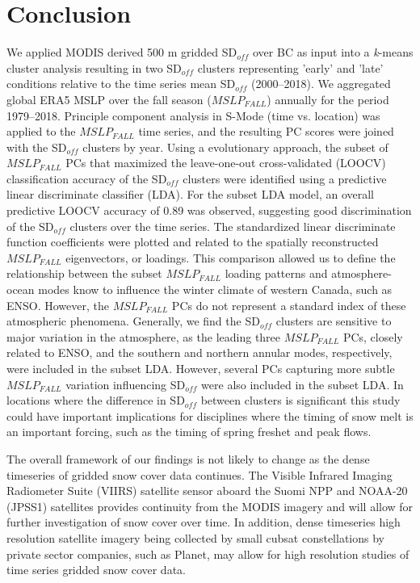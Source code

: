 \documentclass{tATO2e}
\newcommand{\sdoff}{SD$_{off}$}
\begin{document}
\section{Conclusion}
 We applied MODIS derived 500 m gridded \sdoff{} over BC as input into a \textit{k}-means cluster analysis resulting in two \sdoff{} clusters representing 'early' and 'late' conditions relative to the time series mean \sdoff{} (2000--2018). We aggregated global ERA5 MSLP over the fall season ($MSLP_{FALL}$) annually for the period 1979--2018. Principle component analysis in S-Mode (time vs. location) was applied to the $MSLP_{FALL}$ time series, and the resulting PC scores were joined with the \sdoff{} clusters by year. Using a evolutionary approach, the subset of $MSLP_{FALL}$ PCs that maximized the leave-one-out cross-validated (LOOCV) classification accuracy of the \sdoff{} clusters were identified using a predictive linear discriminate classifier (LDA). For the subset LDA model, an overall predictive LOOCV accuracy of 0.89 was observed, suggesting good discrimination of the \sdoff{} clusters over the time series. The standardized linear discriminate function coefficients were plotted and related to the spatially reconstructed $MSLP_{FALL}$ eigenvectors, or loadings. This comparison allowed us to define the relationship between the subset $MSLP_{FALL}$ loading patterns and atmosphere-ocean modes know to influence the winter climate of western Canada, such as ENSO. However, the $MSLP_{FALL}$ PCs do not represent a standard index of these atmospheric phenomena. Generally, we find the \sdoff{} clusters are sensitive to major variation in the atmosphere, as the leading three $MSLP_{FALL}$ PCs, closely related to ENSO, and the southern and northern annular modes, respectively, were included in the subset LDA. However, several PCs capturing more subtle $MSLP_{FALL}$ variation influencing \sdoff{} were also included in the subset LDA. In locations where the difference in \sdoff{} between clusters is significant this study could have important implications for disciplines where the timing of snow melt is an important forcing, such as the timing of spring freshet and peak flows.
\par
The overall framework of our findings is not likely to change as the dense timeseries of gridded snow cover data continues. The Visible Infrared Imaging Radiometer Suite (VIIRS) satellite sensor aboard the Suomi NPP and NOAA-20 (JPSS1) satellites provides continuity from the MODIS imagery and will allow for further investigation of snow cover over time. In addition, dense timeseries high resolution satellite imagery being collected by small cubsat constellations by private sector companies, such as Planet, may allow for high resolution studies of time series gridded snow cover data. 
\end{document}
